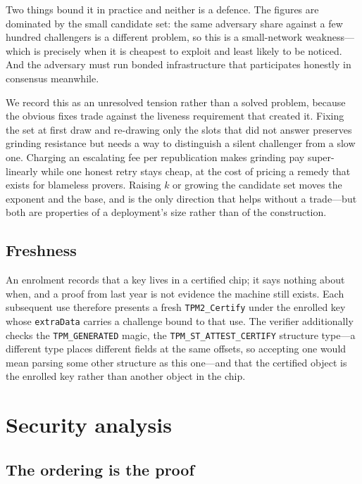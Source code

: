 \documentclass[conference,10pt]{IEEEtran}
\begin{document}
Two things bound it in practice and neither is a defence. The figures are dominated by the small
candidate set: the same adversary share against a few hundred challengers is a different problem, so this
is a small-network weakness---which is precisely when it is cheapest to exploit and least likely to be
noticed. And the adversary must run bonded infrastructure that participates honestly in consensus
meanwhile.

We record this as an unresolved tension rather than a solved problem, because the obvious fixes trade
against the liveness requirement that created it. Fixing the set at first draw and re-drawing only the
slots that did not answer preserves grinding resistance but needs a way to distinguish a silent
challenger from a slow one. Charging an escalating fee per republication makes grinding pay
super-linearly while one honest retry stays cheap, at the cost of pricing a remedy that exists for
blameless provers. Raising $k$ or growing the candidate set moves the exponent and the base, and is the
only direction that helps without a trade---but both are properties of a deployment's size rather than of
the construction.

\subsection{Freshness}

An enrolment records that a key lives in a certified chip; it says nothing about when, and a proof from
last year is not evidence the machine still exists. Each subsequent use therefore presents a fresh
\texttt{TPM2\_Certify} under the enrolled key whose \texttt{extraData} carries a challenge bound to that
use. The verifier additionally checks the \texttt{TPM\_GENERATED} magic, the
\texttt{TPM\_ST\_ATTEST\_CERTIFY} structure type---a different type places different fields at the same
offsets, so accepting one would mean parsing some other structure as this one---and that the certified
object is the enrolled key rather than another object in the chip.

\section{Security analysis}
\label{sec:security}

\subsection{The ordering is the proof}
\end{document}
